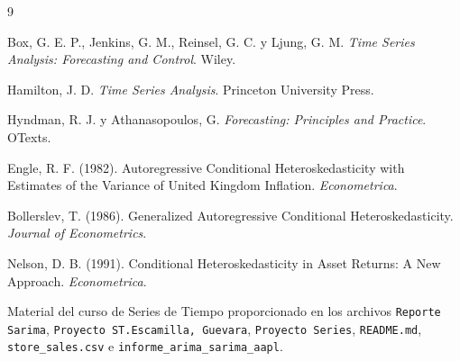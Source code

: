 \documentclass[11pt,letterpaper]{article}
\newcommand{\code}[1]{\texttt{#1}}
\begin{document}
\newpage
\begin{thebibliography}{9}

Box, G. E. P., Jenkins, G. M., Reinsel, G. C. y Ljung, G. M. \textit{Time Series Analysis: Forecasting and Control}. Wiley.

Hamilton, J. D. \textit{Time Series Analysis}. Princeton University Press.

Hyndman, R. J. y Athanasopoulos, G. \textit{Forecasting: Principles and Practice}. OTexts.

Engle, R. F. (1982). Autoregressive Conditional Heteroskedasticity with Estimates of the Variance of United Kingdom Inflation. \textit{Econometrica}.

Bollerslev, T. (1986). Generalized Autoregressive Conditional Heteroskedasticity. \textit{Journal of Econometrics}.

Nelson, D. B. (1991). Conditional Heteroskedasticity in Asset Returns: A New Approach. \textit{Econometrica}.

Material del curso de Series de Tiempo proporcionado en los archivos \code{Reporte Sarima}, \code{Proyecto ST.Escamilla, Guevara}, \code{Proyecto Series}, \code{README.md}, \code{store\_sales.csv} e \code{informe\_arima\_sarima\_aapl}.

\end{thebibliography}
\end{document}
